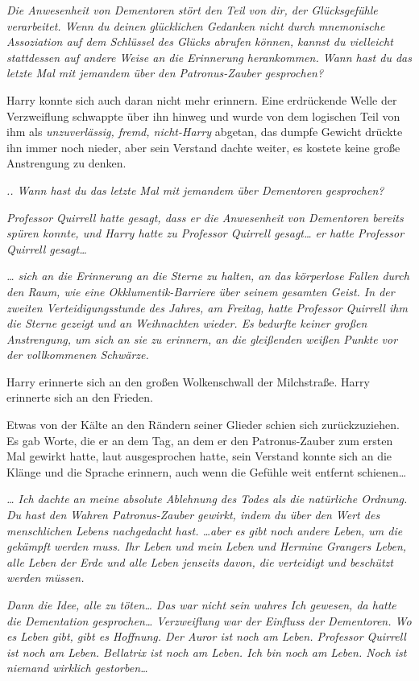 {\emph{Die Anwesenheit von Dementoren stört den Teil von dir, der Glücksgefühle verarbeitet. Wenn du deinen glücklichen Gedanken nicht durch mnemonische Assoziation auf dem Schlüssel des Glücks abrufen können, kannst du vielleicht stattdessen auf andere Weise an die Erinnerung herankommen. Wann hast du das letzte Mal mit jemandem über den Patronus-Zauber gesprochen?}

Harry konnte sich auch daran nicht mehr erinnern. Eine erdrückende Welle der Verzweiflung schwappte über ihn hinweg und wurde von dem logischen Teil von ihm als \emph{unzuverlässig, fremd, nicht-Harry} abgetan, das dumpfe Gewicht drückte ihn immer noch nieder, aber sein Verstand dachte weiter, es kostete keine große Anstrengung zu denken.

\emph{.. Wann hast du das letzte Mal mit jemandem über Dementoren gesprochen?}

\emph{Professor Quirrell hatte gesagt, dass er die Anwesenheit von Dementoren bereits spüren konnte, und Harry hatte zu Professor Quirrell gesagt… er hatte Professor Quirrell gesagt…}

\emph{… sich an die Erinnerung an die Sterne zu halten, an das körperlose Fallen durch den Raum, wie eine Okklumentik-Barriere über seinem gesamten Geist. In der zweiten Verteidigungsstunde des Jahres, am Freitag, hatte Professor Quirrell ihm die Sterne gezeigt und an Weihnachten wieder. Es bedurfte keiner großen Anstrengung, um sich an sie zu erinnern, an die gleißenden weißen Punkte vor der vollkommenen Schwärze.}

Harry erinnerte sich an den großen Wolkenschwall der Milchstraße. Harry erinnerte sich an den Frieden.

Etwas von der Kälte an den Rändern seiner Glieder schien sich zurückzuziehen. Es gab Worte, die er an dem Tag, an dem er den Patronus-Zauber zum ersten Mal gewirkt hatte, laut ausgesprochen hatte, sein Verstand konnte sich an die Klänge und die Sprache erinnern, auch wenn die Gefühle weit entfernt schienen…

\emph{… Ich dachte an meine absolute Ablehnung des Todes als die natürliche Ordnung. Du hast den Wahren Patronus-Zauber gewirkt, indem du über den Wert des menschlichen Lebens nachgedacht hast. …aber es gibt noch andere Leben, um die gekämpft werden muss. Ihr Leben und mein Leben und Hermine Grangers Leben, alle Leben der Erde und alle Leben jenseits davon, die verteidigt und beschützt werden müssen.}

\emph{Dann die Idee, alle zu töten… Das war nicht sein wahres Ich gewesen, da hatte die Dementation gesprochen… Verzweiflung war der Einfluss der Dementoren. Wo es Leben gibt, gibt es Hoffnung. Der Auror ist noch am Leben. Professor Quirrell ist noch am Leben. Bellatrix ist noch am Leben. Ich bin noch am Leben. Noch ist niemand wirklich gestorben…}

}
